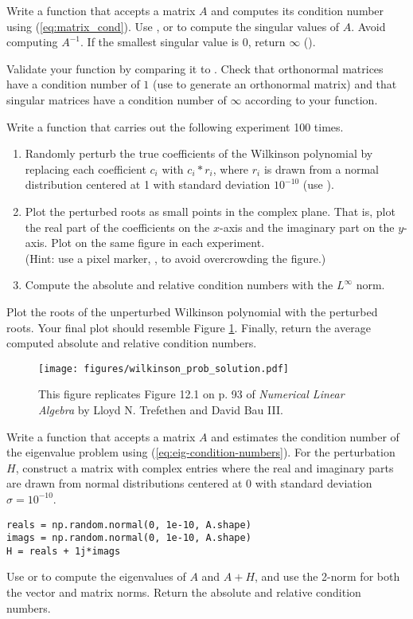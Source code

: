 Write a function that accepts a matrix $A$ and computes its condition number using (\ref{eq:matrix_cond}).
Use , or  to compute the singular values of $A$.
Avoid computing $A^{-1}$.
If the smallest singular value is $0$, return $\infty$ ().

Validate your function by comparing it to .
Check that orthonormal matrices have a condition number of $1$ (use  to generate an orthonormal matrix) and that singular matrices have a condition number of $\infty$ according to your function.

Write a function that carries out the following experiment 100 times.
\begin{enumerate}
\item Randomly perturb the true coefficients of the Wilkinson polynomial by replacing each coefficient $c_i$ with $c_i*r_i$, where $r_i$ is drawn from a normal distribution centered at 1 with standard deviation $10^{-10}$ (use ).
\item Plot the perturbed roots as small points in the complex plane.
That is, plot the real part of the coefficients on the $x$-axis and the imaginary part on the $y$-axis.
Plot on the same figure in each experiment.
\\(Hint: use a pixel marker, , to avoid overcrowding the figure.)
\item Compute the absolute and relative condition numbers with the $L^{\infty}$ norm.
\end{enumerate}
Plot the roots of the unperturbed Wilkinson polynomial with the perturbed roots.
Your final plot should resemble Figure \ref{fig:wilkinsonpolynomial_many}.
Finally, return the average computed absolute and relative condition numbers.

\begin{figure}[H]
\texttt{[image: figures/wilkinson\_prob\_solution.pdf]}
\caption{
This figure replicates Figure 12.1 on p. 93 of \emph{Numerical Linear Algebra} by Lloyd N. Trefethen and David Bau III.}
\label{fig:wilkinsonpolynomial_many}
\end{figure}

\label{prob:wilkinson-polynomial-roots}
\label{prob:eigenvalue} %
Write a function that accepts a matrix $A$ and estimates the condition number of the eigenvalue problem using (\ref{eq:eig-condition-numbers}).
For the perturbation $H$, construct a matrix with complex entries where the real and imaginary parts are drawn from normal distributions centered at $0$ with standard deviation $\sigma = 10^{-10}$.
\begin{lstlisting}
reals = np.random.normal(0, 1e-10, A.shape)
imags = np.random.normal(0, 1e-10, A.shape)
H = reals + 1j*imags
\end{lstlisting}
Use  or  to compute the eigenvalues of $A$ and $A+H$, and use the 2-norm for both the vector and matrix norms.
Return the absolute and relative condition numbers.
\label{prob:eig-condit}

